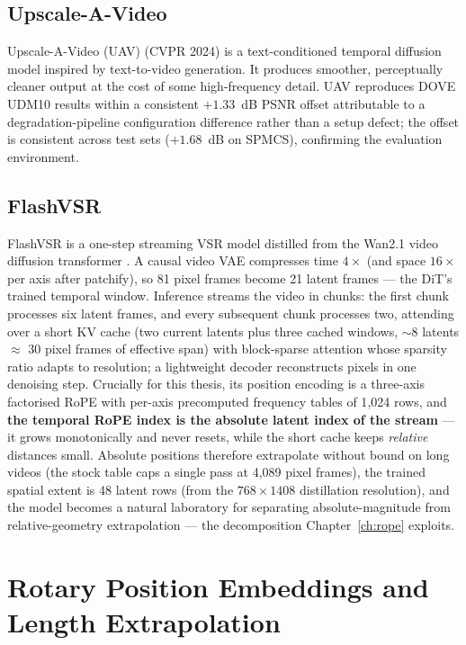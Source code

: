 \subsection{Upscale-A-Video}
Upscale-A-Video (UAV) \cite{zhou_upscale_2024} (CVPR 2024) is a text-conditioned temporal
diffusion model inspired by text-to-video generation. It produces smoother, perceptually
cleaner output at the cost of some high-frequency detail. UAV reproduces DOVE UDM10
results within a consistent $+1.33$~dB PSNR offset attributable to a degradation-pipeline
configuration difference rather than a setup defect; the offset is consistent across test
sets ($+1.68$~dB on SPMCS), confirming the evaluation environment.

\subsection{FlashVSR}
FlashVSR \cite{zhuang_flashvsr_2025} is a one-step streaming VSR model distilled
from the Wan2.1 video diffusion transformer \cite{wan_wan_2025}. A causal video
VAE compresses time $4\times$ (and space $16\times$ per axis after patchify), so
81 pixel frames become 21 latent frames --- the DiT's trained temporal window.
Inference streams the video in chunks: the first chunk processes six latent
frames, and every subsequent chunk processes two, attending over a short KV
cache (two current latents plus three cached windows, $\sim$8 latents
$\approx$ 30 pixel frames of effective span) with block-sparse attention whose
sparsity ratio adapts to resolution; a lightweight decoder reconstructs pixels
in one denoising step. Crucially for this thesis, its position encoding is a
three-axis factorised RoPE with per-axis precomputed frequency tables of 1{,}024
rows, and \textbf{the temporal RoPE index is the absolute latent index of the
stream} --- it grows monotonically and never resets, while the short cache keeps
\emph{relative} distances small. Absolute positions therefore extrapolate
without bound on long videos (the stock table caps a single pass at 4{,}089
pixel frames), the trained spatial extent is 48 latent rows (from the
$768\times1408$ distillation resolution), and the model becomes a natural
laboratory for separating absolute-magnitude from relative-geometry
extrapolation --- the decomposition Chapter~\ref{ch:rope} exploits.

\section{Rotary Position Embeddings and Length Extrapolation}
\label{sec:found:rope}

